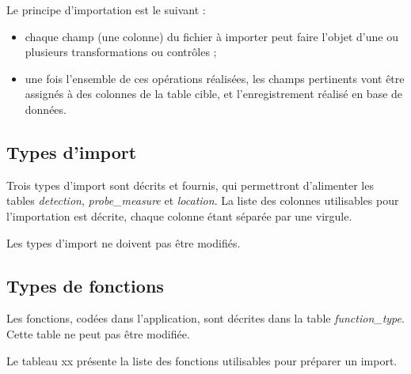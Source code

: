 Le principe d'importation est le suivant :
\begin{itemize}
	\item chaque champ (une colonne) du fichier à importer peut faire l'objet d'une ou plusieurs transformations ou contrôles ;
	\item une fois l'ensemble de ces opérations réalisées, les champs pertinents vont être assignés à des colonnes de la table cible, et l'enregistrement réalisé en base de données.
\end{itemize}

\subsection{Types d'import}

Trois types d'import sont décrits et fournis, qui permettront d'alimenter les tables \textit{detection}, \textit{probe\_measure} et \textit{location}. 
La liste des colonnes utilisables pour l'importation est décrite, chaque colonne étant séparée par une virgule.

Les types d'import ne doivent pas être modifiés.

\subsection{Types de fonctions}

Les fonctions, codées dans l'application, sont décrites dans la table \textit{function\_type}. Cette table ne peut pas être modifiée.

Le tableau xx présente la liste des fonctions utilisables pour préparer un import.

